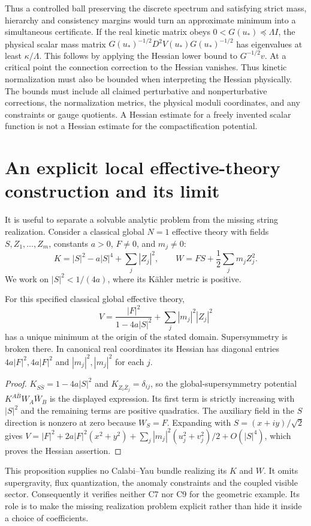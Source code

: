 Thus a controlled ball preserving the discrete spectrum and satisfying
strict mass, hierarchy and consistency margins would turn an approximate
minimum into a simultaneous certificate. If the real kinetic matrix obeys
$0<G(u_*)\preceq\Lambda I$, the physical scalar mass matrix
$G(u_*)^{-1/2}D^2V(u_*)G(u_*)^{-1/2}$ has eigenvalues at least
$\kappa/\Lambda$. This follows by applying the Hessian lower bound to
$G^{-1/2}v$. At a critical point the connection correction to the Hessian
vanishes. Thus kinetic normalization must also be bounded when interpreting
the Hessian physically. The bounds must include all
claimed perturbative and nonperturbative corrections, the normalization
metrics, the physical moduli coordinates, and any constraints or gauge
quotients. A Hessian estimate for a freely invented scalar function is
not a Hessian estimate for the compactification potential.

\section{An explicit local effective-theory construction and its limit}
It is useful to separate a solvable analytic problem from the missing
string realization. Consider a classical global $N=1$ effective theory
with fields $S,Z_1,\ldots,Z_m$, constants $a>0$, $F\ne0$, and $m_j\ne0$:
\[
 K=|S|^2-a|S|^4+\sum_j|Z_j|^2,
 \qquad W=FS+\frac12\sum_jm_jZ_j^2.
\]
We work on $|S|^2<1/(4a)$, where its K\"ahler metric is positive.

\begin{proposition}\label{prop:eft}
For this specified classical global effective theory,
\[
 V=\frac{|F|^2}{1-4a|S|^2}+\sum_j|m_j|^2|Z_j|^2
\]
has a unique minimum at the origin of the stated domain. Supersymmetry
is broken there. In canonical real coordinates its Hessian has diagonal
entries $4a|F|^2,4a|F|^2$ and $|m_j|^2,|m_j|^2$ for each $j$.
\end{proposition}
\begin{proof}
$K_{S\bar S}=1-4a|S|^2$ and $K_{Z_i\bar Z_j}=\delta_{ij}$, so the
global-supersymmetry potential $K^{A\bar B}W_A\overline W_B$ is the
displayed expression. Its first term is strictly increasing with $|S|^2$
and the remaining terms are positive quadratics. The auxiliary field in
the $S$ direction is nonzero at zero because $W_S=F$. Expanding with
$S=(x+iy)/\sqrt2$ gives
$V=|F|^2+2a|F|^2(x^2+y^2)+\sum_j|m_j|^2(u_j^2+v_j^2)/2+O(|S|^4)$,
which proves the Hessian assertion.
\end{proof}
This proposition supplies no Calabi--Yau bundle realizing its $K$ and $W$.
It omits supergravity, flux quantization, the anomaly constraints and
the coupled visible sector. Consequently it verifies neither C7 nor C9
for the geometric example. Its role is to make the missing realization
problem explicit rather than hide it inside a choice of coefficients.

